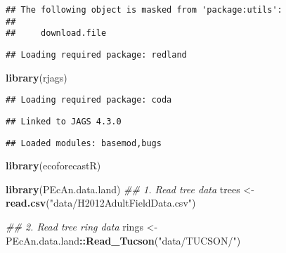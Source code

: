 \documentclass[]{article}
\newenvironment{Shaded}{\begin{snugshade}}{\end{snugshade}}
\newcommand{\CommentTok}[1]{\textcolor[rgb]{0.56,0.35,0.01}{\textit{#1}}}
\newcommand{\KeywordTok}[1]{\textcolor[rgb]{0.13,0.29,0.53}{\textbf{#1}}}
\newcommand{\NormalTok}[1]{#1}
\newcommand{\OperatorTok}[1]{\textcolor[rgb]{0.81,0.36,0.00}{\textbf{#1}}}
\newcommand{\StringTok}[1]{\textcolor[rgb]{0.31,0.60,0.02}{#1}}
\begin{document}
\begin{verbatim}
## The following object is masked from 'package:utils':
## 
##     download.file
\end{verbatim}

\begin{verbatim}
## Loading required package: redland
\end{verbatim}

\begin{Shaded}
\begin{Highlighting}[]
\KeywordTok{library}\NormalTok{(rjags)}
\end{Highlighting}
\end{Shaded}

\begin{verbatim}
## Loading required package: coda
\end{verbatim}

\begin{verbatim}
## Linked to JAGS 4.3.0
\end{verbatim}

\begin{verbatim}
## Loaded modules: basemod,bugs
\end{verbatim}

\begin{Shaded}
\begin{Highlighting}[]
\KeywordTok{library}\NormalTok{(ecoforecastR)}
\end{Highlighting}
\end{Shaded}

\begin{Shaded}
\begin{Highlighting}[]
\KeywordTok{library}\NormalTok{(PEcAn.data.land)}
\CommentTok{## 1. Read tree data}
\NormalTok{trees <-}\StringTok{ }\KeywordTok{read.csv}\NormalTok{(}\StringTok{"data/H2012AdultFieldData.csv"}\NormalTok{)}

\CommentTok{## 2. Read tree ring data}
\NormalTok{rings <-}\StringTok{ }\NormalTok{PEcAn.data.land}\OperatorTok{::}\KeywordTok{Read_Tucson}\NormalTok{(}\StringTok{"data/TUCSON/"}\NormalTok{)}
\end{Highlighting}
\end{Shaded}
\end{document}
